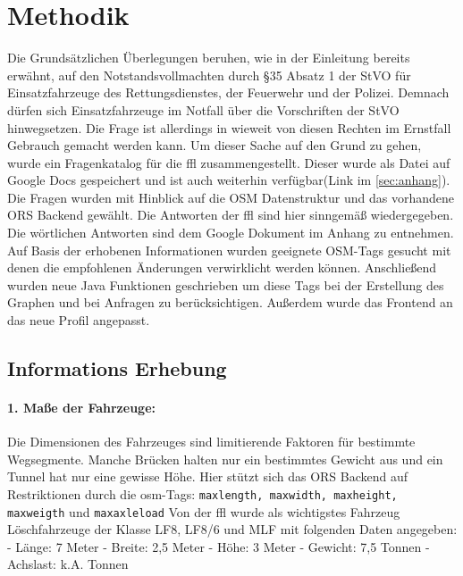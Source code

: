 \section{Methodik}
Die Grundsätzlichen Überlegungen beruhen, wie in der Einleitung bereits erwähnt, auf den Notstandsvollmachten durch §35 Absatz 1 der StVO für Einsatzfahrzeuge des Rettungsdienstes, der Feuerwehr und der Polizei.
Demnach dürfen sich Einsatzfahrzeuge im Notfall über die Vorschriften der StVO hinwegsetzen. Die Frage ist allerdings in wieweit von diesen Rechten im Ernstfall Gebrauch gemacht werden kann.
Um dieser Sache auf den Grund zu gehen, wurde ein Fragenkatalog für die \gls{ffl} zusammengestellt. Dieser wurde als Datei auf Google Docs gespeichert und ist auch weiterhin verfügbar(Link im \ref{sec:anhang}).
Die Fragen wurden mit Hinblick auf die OSM Datenstruktur und das vorhandene ORS Backend gewählt. Die Antworten der \gls{ffl} sind hier sinngemäß wiedergegeben.
Die wörtlichen Antworten sind dem Google Dokument im Anhang zu entnehmen.
Auf Basis der erhobenen Informationen wurden geeignete OSM-Tags gesucht mit denen die empfohlenen Änderungen verwirklicht werden können. Anschließend wurden neue Java Funktionen geschrieben um diese Tags bei der Erstellung des Graphen und bei Anfragen zu berücksichtigen.
Außerdem wurde das Frontend an das neue Profil angepasst.

\subsection{Informations Erhebung}

\paragraph*{1. Maße der Fahrzeuge:}
\label{frage1}
Die Dimensionen des Fahrzeuges sind limitierende Faktoren für bestimmte Wegsegmente. Manche Brücken halten nur ein bestimmtes Gewicht aus und ein Tunnel hat nur eine gewisse Höhe.
Hier stützt sich das ORS Backend auf Restriktionen durch die \gls{osm}-Tags: \texttt{maxlength, maxwidth, maxheight, maxweigth} und \texttt{maxaxleload} Von der \gls{ffl} wurde als wichtigstes Fahrzeug Löschfahrzeuge der Klasse LF8, LF8/6 und MLF mit folgenden Daten angegeben:
- Länge: 7 Meter
- Breite: 2,5 Meter
- Höhe: 3 Meter
- Gewicht: 7,5 Tonnen
- Achslast: k.A. Tonnen 

